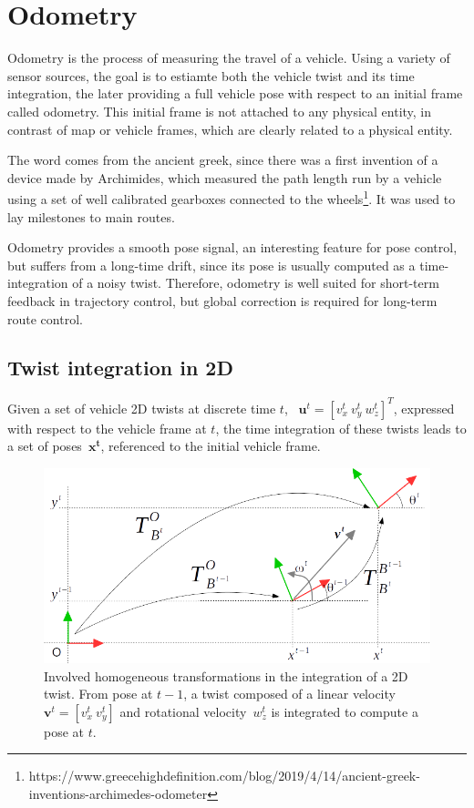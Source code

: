 \section{Odometry}
\label{sec:odometry}
Odometry is the process of measuring the travel of a vehicle. Using  a variety of sensor sources, the goal is to estiamte both the vehicle twist and its time integration, the later providing a full vehicle pose with respect to an initial frame called odometry. This initial frame is not attached to any physical entity, in contrast of map or vehicle frames, which are clearly related to a physical entity.

The word comes from the ancient greek, since there was a first invention of a device made by Archimides, which measured the path length run by a vehicle using a set of well calibrated gearboxes connected to the wheels\footnote{https://www.greecehighdefinition.com/blog/2019/4/14/ancient-greek-inventions-archimedes-odometer}. It was used to lay milestones to main routes. 

Odometry provides a smooth pose signal, an interesting feature for pose control, but suffers from a long-time drift, since its pose is usually computed as a time-integration of a noisy twist. Therefore, odometry is well suited for short-term feedback in trajectory control, but global correction is required for long-term route control.

\subsection{Twist integration in 2D}
Given a set of vehicle 2D twists at discrete time $t$, ~$\mathbf{u}^t=[v^t_x\ v^t_y\ w^t_z]^T$, expressed with respect to the vehicle frame at $t$, the time integration of these twists leads to a set of poses~$\mathbf{x^t}$, referenced to the initial vehicle frame.
\begin{figure}[bth!]
  \begin{center}
    \includegraphics[width=1.0\columnwidth]{figures/odometry_integration_2d.png}
    \caption{Involved homogeneous transformations in the integration of a 2D twist. From pose at $t-1$, a twist composed of a linear velocity~$\mathbf{v}^t=[v^t_x\ v^t_y]$ and rotational velocity~$w^t_z$ is integrated to compute a pose at $t$.}
    \label{fig:odometry_integration_2d}
  \end{center}
\end{figure}

